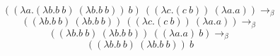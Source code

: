 \documentclass{article}
\begin{document}
\Large$$((\lambda a.(\lambda b.b\ b)\ (\lambda b.b\ b))\ b)\ ((\lambda c.(c\ b))\ (\lambda a.a))
\rightarrow_\beta$$
$$((\lambda b.b\ b)\ (\lambda b.b\ b))\ ((\lambda c.(c\ b))\ (\lambda a.a))\rightarrow_\beta$$
$$((\lambda b.b\ b)\ (\lambda b.b\ b))\ ((\lambda a.a)\ b)\rightarrow_\beta$$
$$((\lambda b.b\ b)\ (\lambda b.b\ b))\ b$$
\end{document}
